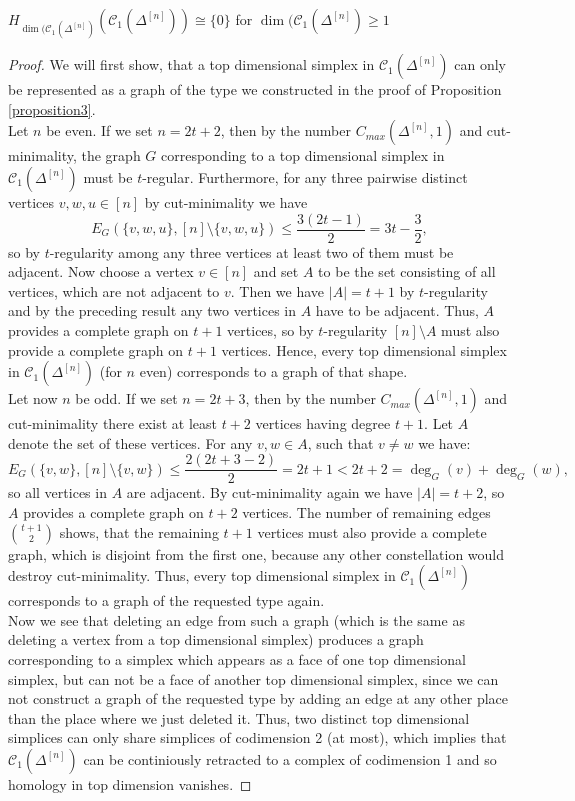 \begin{thm}\label{theorem3}
\(H_{\dim(\mathcal{C}_1(\Delta^{[n]})}(\mathcal{C}_1(\Delta^{[n]}))\cong\{0\}\) for \(\dim(\mathcal{C}_1(\Delta^{[n]})\geq 1\)
\begin{proof}
We will first show, that a top dimensional simplex in \(\mathcal{C}_1(\Delta^{[n]})\) can only be represented as a graph of the type we constructed in the proof of Proposition \ref{proposition3}.\\
Let \(n\) be even. If we set \(n=2t+2\), then by the number \(C_{max}(\Delta^{[n]},1)\) and cut-minimality, the graph \(G\) corresponding to a top dimensional simplex in \(\mathcal{C}_1(\Delta^{[n]})\) must be \(t\)-regular. Furthermore, for any three pairwise distinct vertices \(v,w,u\in [n]\) by cut-minimality we have
\[
E_G(\{v,w,u\},[n]\setminus\{v,w,u\})\leq\frac{3(2t-1)}{2}=3t-\frac{3}{2},
\]
so by \(t\)-regularity among any three vertices at least two of them must be adjacent. Now choose a vertex \(v\in [n]\) and set \(A\) to be the set consisting of all vertices, which are not adjacent to \(v\). Then we have \(|A|=t+1\) by \(t\)-regularity and by the preceding result any two vertices in \(A\) have to be adjacent. Thus, \(A\) provides a complete graph on \(t+1\) vertices, so by \(t\)-regularity \([n]\setminus A\) must also provide a complete graph on \(t+1\) vertices. Hence, every top dimensional simplex in \(\mathcal{C}_1(\Delta^{[n]})\) (for \(n\) even) corresponds to a graph of that shape.\\
Let now \(n\) be odd. If we set \(n=2t+3\), then by the number \(C_{max}(\Delta^{[n]},1)\) and cut-minimality there exist at least \(t+2\) vertices having degree \(t+1\). Let \(A\) denote the set of these vertices. For any \(v,w\in A\), such that \(v\neq w\) we have:
\[
E_G(\{v,w\},[n]\setminus\{v,w\})\leq\frac{2(2t+3-2)}{2}=2t+1<2t+2=\deg_G(v)+\deg_G(w),
\]
so all vertices in \(A\) are adjacent. By cut-minimality again we have \(|A|=t+2\), so \(A\) provides a complete graph on \(t+2\) vertices. The number of remaining edges \(\binom{t+1}{2}\) shows, that the remaining \(t+1\) vertices must also provide a complete graph, which is disjoint from the first one, because any other constellation would destroy cut-minimality. Thus, every top dimensional simplex in \(\mathcal{C}_1(\Delta^{[n]})\) corresponds to a graph of the requested type again.\\
Now we see that deleting an edge from such a graph (which is the same as deleting a vertex from a top dimensional simplex) produces a graph corresponding to a simplex which appears as a face of one top dimensional simplex, but can not be a face of another top dimensional simplex, since we can not construct a graph of the requested type by adding an edge at any other place than the place where we just deleted it. Thus, two distinct top dimensional simplices can only share simplices of codimension 2 (at most), which implies that \(\mathcal{C}_1(\Delta^{[n]})\) can be continiously retracted to a complex of codimension 1 and so homology in top dimension vanishes.
\end{proof}
\end{thm}

